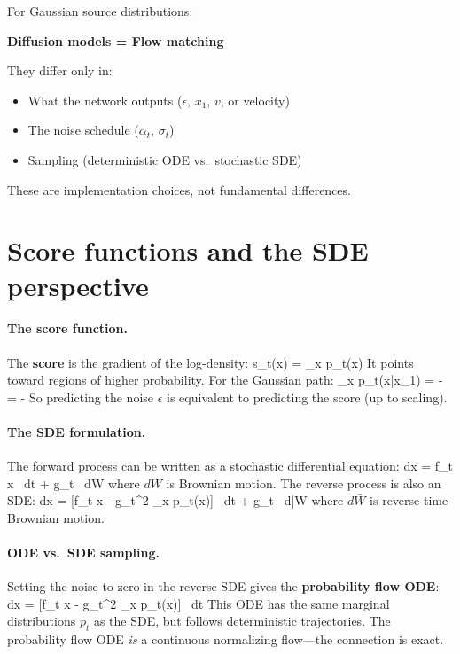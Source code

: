 \documentclass[11pt]{article}
\begin{document}
\begin{sciencebox}
For Gaussian source distributions:
\begin{center}
\textbf{Diffusion models = Flow matching}
\end{center}
They differ only in:
\begin{itemize}
\item What the network outputs ($\epsilon$, $x_1$, $v$, or velocity)
\item The noise schedule ($\alpha_t$, $\sigma_t$)
\item Sampling (deterministic ODE vs.\ stochastic SDE)
\end{itemize}
These are implementation choices, not fundamental differences.
\end{sciencebox}

\section{Score functions and the SDE perspective}

\paragraph{The score function.} The \textbf{score} is the gradient of the log-density:
\beq
s_t(x) = \nabla_x \log p_t(x)
\eeq
It points toward regions of higher probability. For the Gaussian path:
\beq
\nabla_x \log p_t(x|x_1) = - = -
\eeq
So predicting the noise $\epsilon$ is equivalent to predicting the score (up to scaling).

\paragraph{The SDE formulation.} The forward process can be written as a stochastic differential equation:
\beq
dx = f_t x \, dt + g_t \, dW
\eeq
where $dW$ is Brownian motion. The reverse process is also an SDE:
\beq
dx = [f_t x - g_t^2 \nabla_x \log p_t(x)] \, dt + g_t \, d\bar{W}
\eeq
where $d\bar{W}$ is reverse-time Brownian motion.

\paragraph{ODE vs.\ SDE sampling.} Setting the noise to zero in the reverse SDE gives the \textbf{probability flow ODE}:
\beq
dx = [f_t x - g_t^2 \nabla_x \log p_t(x)] \, dt
\eeq
This ODE has the same marginal distributions $p_t$ as the SDE, but follows deterministic trajectories. The probability flow ODE \emph{is} a continuous normalizing flow---the connection is exact.
\end{document}
